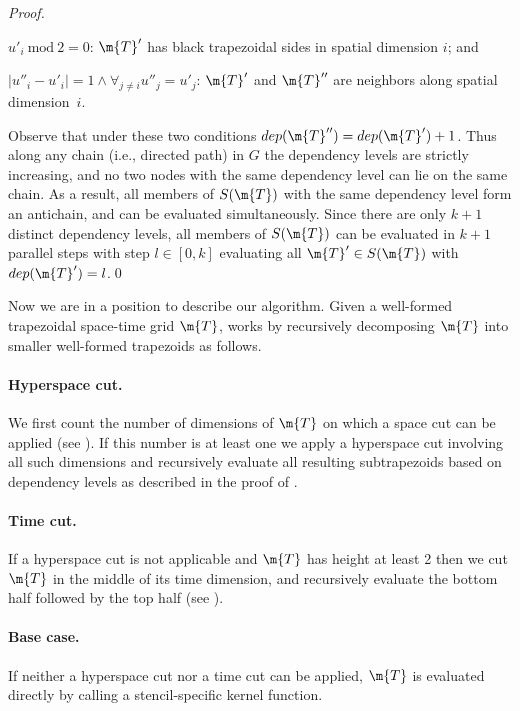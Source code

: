 \begin{proof}
\begin{closeitemize}

\item $u'_i ~\textrm{mod}~ 2 = 0$:
$\m{T}'$ has black trapezoidal
sides in spatial dimension $i$;
and 

\item $|u''_i - u'_i| = 1 \wedge
\forall_{j \neq i}{u''_j = u'_j}$:
$\m{T}'$ and $\m{T}''$ 
are neighbors along spatial dimension~$i$.

\end{closeitemize}

Observe that under these two conditions
$dep(\m{T}'') = dep(\m{T}') + 1$. Thus along
any chain (i.e., directed path) in $G$ the dependency
levels are strictly increasing, and no two nodes 
with the same dependency level can lie on
the same chain. As a result, all members of $S(\m{T})$ with 
the same dependency level form an antichain, and can be
evaluated simultaneously. Since there are only
$k + 1$ distinct dependency levels, all 
members of $S(\m{T})$ can be evaluated in
$k + 1$ parallel steps with step $l \in [0, k]$
evaluating all $\m{T}' \in S(\m{T})$
with $dep(\m{T}') = l$.\qed
%
\end{proof}

Now we are in a position to describe our algorithm.
Given a well-formed trapezoidal space-time grid 
$\m{T}$, 
works by recursively decomposing $\m{T}$ into smaller
well-formed trapezoids as follows.
%


\paragraph{Hyperspace cut.}
%
We first count the number of dimensions of $\m{T}$ on which a 
space cut can be applied (see ). 
If this number is at least one
we apply a hyperspace cut involving all such dimensions
and recursively evaluate all resulting subtrapezoids
based on dependency levels as described in the proof
of . 
%

\paragraph{Time cut.}
%
If a hyperspace cut is not applicable and $\m{T}$ has height
at least 2 then we cut $\m{T}$ in the
middle of its time dimension, and recursively evaluate the 
bottom half followed by the top half (see ).
%

\paragraph{Base case.}
%
If neither a hyperspace cut nor a time cut can be applied,
$\m{T}$ is evaluated directly 
by calling a stencil-specific kernel function.


